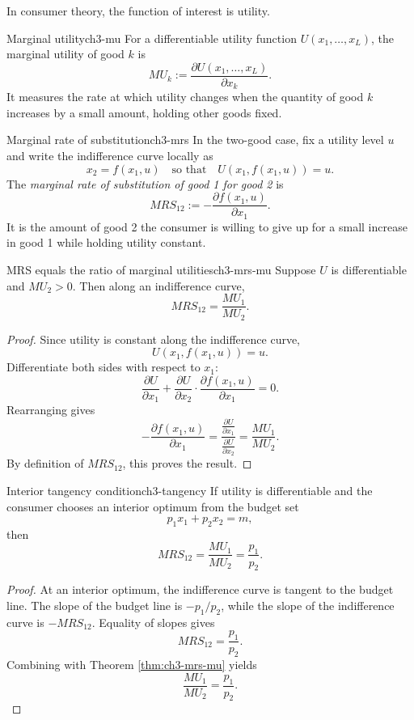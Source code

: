 In consumer theory, the function of interest is utility.

\begin{definition}{Marginal utility}{ch3-mu}
For a differentiable utility function $U(x_1,\dots,x_L)$, the marginal utility of good $k$ is
\[
MU_k := \frac{\partial U(x_1,\dots,x_L)}{\partial x_k}.
\]
It measures the rate at which utility changes when the quantity of good $k$ increases by a small amount, holding other goods fixed.
\end{definition}

\begin{definition}{Marginal rate of substitution}{ch3-mrs}
In the two-good case, fix a utility level $u$ and write the indifference curve locally as
\[
x_2 = f(x_1,u)
\quad \text{so that} \quad
U(x_1,f(x_1,u))=u.
\]
The \emph{marginal rate of substitution of good 1 for good 2} is
\[
MRS_{12} := -\frac{\partial f(x_1,u)}{\partial x_1}.
\]
It is the amount of good 2 the consumer is willing to give up for a small increase in good 1 while holding utility constant.
\end{definition}

\begin{theorem}{MRS equals the ratio of marginal utilities}{ch3-mrs-mu}
Suppose $U$ is differentiable and $MU_2>0$. Then along an indifference curve,
\[
MRS_{12}=\frac{MU_1}{MU_2}.
\]
\end{theorem}

\begin{proof}
Since utility is constant along the indifference curve,
\[
U(x_1,f(x_1,u))=u.
\]
Differentiate both sides with respect to $x_1$:
\[
\frac{\partial U}{\partial x_1}
+
\frac{\partial U}{\partial x_2}\cdot \frac{\partial f(x_1,u)}{\partial x_1}
=0.
\]
Rearranging gives
\[
-\frac{\partial f(x_1,u)}{\partial x_1}
=
\frac{\frac{\partial U}{\partial x_1}}{\frac{\partial U}{\partial x_2}}
=
\frac{MU_1}{MU_2}.
\]
By definition of $MRS_{12}$, this proves the result.
\end{proof}

\begin{theorem}{Interior tangency condition}{ch3-tangency}
If utility is differentiable and the consumer chooses an interior optimum from the budget set
\[
p_1x_1+p_2x_2=m,
\]
then
\[
MRS_{12}=\frac{MU_1}{MU_2}=\frac{p_1}{p_2}.
\]
\end{theorem}

\begin{proof}
At an interior optimum, the indifference curve is tangent to the budget line. The slope of the budget line is $-p_1/p_2$, while the slope of the indifference curve is $-MRS_{12}$. Equality of slopes gives
\[
MRS_{12}=\frac{p_1}{p_2}.
\]
Combining with Theorem \ref{thm:ch3-mrs-mu} yields
\[
\frac{MU_1}{MU_2}=\frac{p_1}{p_2}.
\]
\end{proof}

